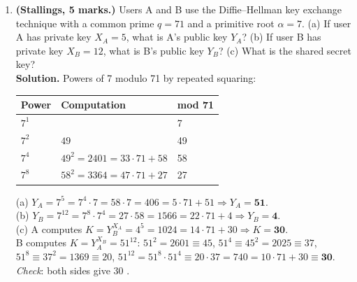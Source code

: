 \begin{enumerate}[leftmargin=1.6em,itemsep=4pt]
  \item \textbf{(Stallings, 5 marks.)} Users A and B use the Diffie--Hellman key exchange technique with a common prime $q = 71$ and a primitive root $\alpha = 7$. (a) If user A has private key $X_A = 5$, what is A's public key $Y_A$? (b) If user B has private key $X_B = 12$, what is B's public key $Y_B$? (c) What is the shared secret key?\\
  \textbf{Solution.} Powers of 7 modulo 71 by repeated squaring:
  \begin{center}\small
  \begin{tabular}{@{}lll@{}}
  \toprule
  Power & Computation & mod 71\\
  \midrule
  $7^1$ & & 7\\
  $7^2$ & $49$ & 49\\
  $7^4$ & $49^2 = 2401 = 33 \cdot 71 + 58$ & 58\\
  $7^8$ & $58^2 = 3364 = 47 \cdot 71 + 27$ & 27\\
  \bottomrule
  \end{tabular}
  \end{center}
  (a) $Y_A = 7^5 = 7^4 \cdot 7 = 58 \cdot 7 = 406 = 5 \cdot 71 + 51 \Rightarrow Y_A = \mathbf{51}$.\\
  (b) $Y_B = 7^{12} = 7^8 \cdot 7^4 = 27 \cdot 58 = 1566 = 22 \cdot 71 + 4 \Rightarrow Y_B = \mathbf{4}$.\\
  (c) A computes $K = Y_B^{X_A} = 4^5 = 1024 = 14 \cdot 71 + 30 \Rightarrow K = \mathbf{30}$.\\
  B computes $K = Y_A^{X_B} = 51^{12}$: $51^2 = 2601 \equiv 45$, $51^4 \equiv 45^2 = 2025 \equiv 37$, $51^8 \equiv 37^2 = 1369 \equiv 20$, $51^{12} = 51^8 \cdot 51^4 \equiv 20 \cdot 37 = 740 = 10 \cdot 71 + 30 \equiv \mathbf{30}$.\\
  \emph{Check}: both sides give 30 \checkmark.


\end{enumerate}
